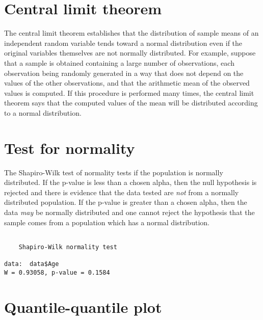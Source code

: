 \documentclass[]{book}
\newenvironment{Shaded}{\begin{snugshade}}{\end{snugshade}}
\newcommand{\KeywordTok}[1]{\textcolor[rgb]{0.13,0.29,0.53}{\textbf{#1}}}
\newcommand{\StringTok}[1]{\textcolor[rgb]{0.31,0.60,0.02}{#1}}
\newcommand{\CommentTok}[1]{\textcolor[rgb]{0.56,0.35,0.01}{\textit{#1}}}
\newcommand{\OperatorTok}[1]{\textcolor[rgb]{0.81,0.36,0.00}{\textbf{#1}}}
\newcommand{\NormalTok}[1]{#1}
\theoremstyle{definition}
\theoremstyle{definition}
\theoremstyle{definition}
\theoremstyle{remark}
\begin{document}
\section{Central limit theorem}\label{central-limit-theorem}

The central limit theorem establishes that the distribution of sample
means of an independent random variable tends toward a normal
distribution even if the original variables themselves are not normally
distributed. For example, suppose that a sample is obtained containing a
large number of observations, each observation being randomly generated
in a way that does not depend on the values of the other observations,
and that the arithmetic mean of the observed values is computed. If this
procedure is performed many times, the central limit theorem says that
the computed values of the mean will be distributed according to a
normal distribution.

\section{Test for normality}\label{test-for-normality}

The Shapiro-Wilk test of normality tests if the population is normally
distributed. If the p-value is less than a chosen alpha, then the null
hypothesis is rejected and there is evidence that the data tested are
\emph{not} from a normally distributed population. If the p-value is
greater than a chosen alpha, then the data \emph{may} be normally
distributed and one cannot reject the hypothesis that the sample comes
from a population which has a normal distribution.

\begin{Shaded}
\end{Shaded}

\begin{verbatim}

    Shapiro-Wilk normality test

data:  data$Age
W = 0.93058, p-value = 0.1584
\end{verbatim}

\section{Quantile-quantile plot}\label{quantile-quantile-plot}
\end{document}
